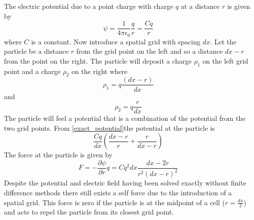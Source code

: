 \documentclass[12pt]{article}
\def\be{\begin{equation}}
\def\ee{\end{equation}}
\begin{document}
The electric potential due to a point charge with charge $q$ at a distance $r$ is given by 
\be 
\psi = \frac{1}{4 \pi \epsilon_0} \frac{q}{r} = \frac{C q}{r}
\label{exact_potential}
\ee 
where $C$ is a constant. Now introduce a spatial grid with spacing $dx$. Let the particle be a distance $r$ from the grid point on the left and so a distance $dx - r$ from the point on the right. The particle will deposit a charge $\rho_1$ on the left grid point and a charge $\rho_2$ on the right where
\be 
\rho_1 = q\frac{(dx-r)}{dx}
\ee 
and
\be 
\rho_2 = q\frac{r}{dx}
\ee 
The particle will feel a potential that is a combination of the potential from the two grid points. From \eqref{exact_potential}the potential at the particle is 
\be 
\frac{C q}{dx} \left(\frac{dx - r}{r} + \frac{r}{dx - r} \right) 
\ee 
The force at the particle is given by 
\be 
F = -\frac{\partial \psi}{\partial r} q = Cq^2 dx\frac{dx-2r}{r^2(dx-r)^2}
\ee 
Despite the potential and electric field having been solved exactly without finite difference methods there still exists a self force due to the introduction of a spatial grid. This force is zero if the particle is at the midpoint of a cell ($r=\frac{dx}{2}$) and acts to repel the particle from its closest grid point.
\end{document}
